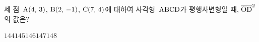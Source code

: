 세 점~$\mathrm{A}(4,\,3)$, $\mathrm{B}(2,\,-1)$, $\mathrm{C}(7,\,4)$에 대하여 사각형~$\mathrm{ABCD}$가 평행사변형일 때, $\overline{\mathrm{OD}}^2$의 값은? 
\begin{choices32}{$144$}{$145$}{$146$}{$147$}{$148$}\end{choices32}

